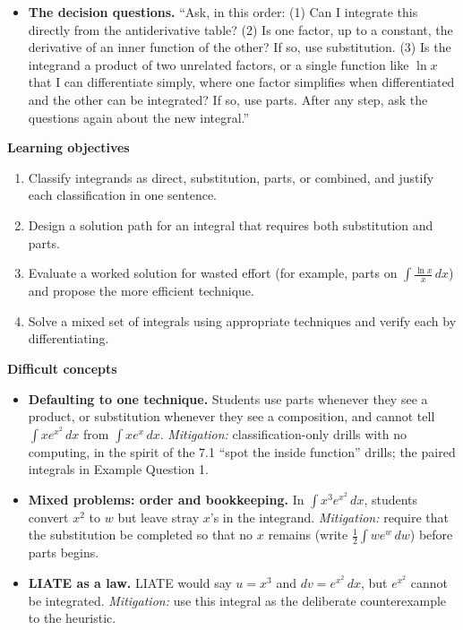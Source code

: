 \documentclass[11pt]{article}
\begin{document}
\begin{defbox}
\begin{itemize}
\item \textbf{The decision questions.} ``Ask, in this order: (1) Can I integrate this directly from the antiderivative table? (2) Is one factor, up to a constant, the derivative of an inner function of the other? If so, use substitution. (3) Is the integrand a product of two unrelated factors, or a single function like $\ln x$ that I can differentiate simply, where one factor simplifies when differentiated and the other can be integrated? If so, use parts. After any step, ask the questions again about the new integral.''
\end{itemize}
\end{defbox}

\textbf{Learning objectives}
\begin{enumerate}
\item Classify integrands as direct, substitution, parts, or combined, and justify each classification in one sentence.
\item Design a solution path for an integral that requires both substitution and parts.
\item Evaluate a worked solution for wasted effort (for example, parts on $\int\frac{\ln x}{x}\,dx$) and propose the more efficient technique.
\item Solve a mixed set of integrals using appropriate techniques and verify each by differentiating.
\end{enumerate}

\textbf{Difficult concepts}
\begin{itemize}
\item \textbf{Defaulting to one technique.} Students use parts whenever they see a product, or substitution whenever they see a composition, and cannot tell $\int xe^{x^2}\,dx$ from $\int xe^{x}\,dx$. \emph{Mitigation:} classification-only drills with no computing, in the spirit of the 7.1 ``spot the inside function'' drills; the paired integrals in Example Question 1.
\item \textbf{Mixed problems: order and bookkeeping.} In $\int x^3e^{x^2}\,dx$, students convert $x^2$ to $w$ but leave stray $x$'s in the integrand. \emph{Mitigation:} require that the substitution be completed so that no $x$ remains (write $\frac12\int we^{w}\,dw$) before parts begins.
\item \textbf{LIATE as a law.} LIATE would say $u=x^3$ and $dv=e^{x^2}\,dx$, but $e^{x^2}$ cannot be integrated. \emph{Mitigation:} use this integral as the deliberate counterexample to the heuristic.
\end{itemize}
\end{document}
